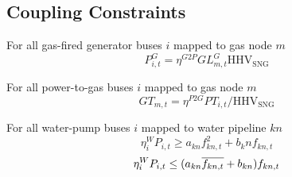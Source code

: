 \subsection{Coupling Constraints}

For all gas-fired generator buses $i$ mapped to gas node $m$ \atallt{}
\begin{equation}
  P^G_{i,t} = \eta^{G2P} GL^G_{m,t} \text{HHV}_{\text{SNG}}
\end{equation}

For all power-to-gas buses $i$ mapped to gas node $m$ \atallt{}
\begin{equation}
  GT_{m,t} =  \eta^{P2G} PT_{i,t} /\text{HHV}_\text{SNG}
\end{equation}

For all water-pump buses $i$ mapped to water pipeline $kn$ \atallt{}
\begin{equation}
  \eta^W_i P_{i,t} \geq a_{kn} f^2_{kn,t} + b_kn f_{kn,t}
\end{equation}
\begin{equation}
  \eta^W_i P_{i,t} \leq (a_{kn} \overline{f_{kn,t}} + b_{kn}) f_{kn,t}
\end{equation}
